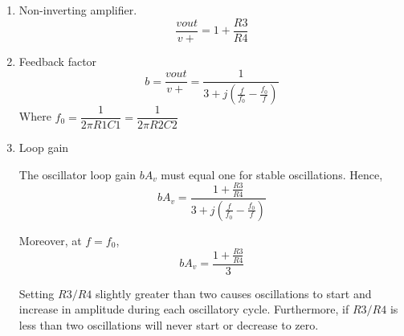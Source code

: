 \begin{enumerate}
\item  Non-inverting amplifier.
\begin{equation}
\dfrac{vout}{v+} = 1 + \dfrac{R3}{R4}
\end{equation}

\item Feedback factor
\begin{equation}
b = \dfrac{vout}{v+} =\dfrac{1}{3+j(\frac{f}{f_{0}}-\frac{f_{0}}{f})}
\end{equation}
Where $f_{0} = \dfrac{1}{2\pi R1 C1} =\dfrac{1}{2\pi R2 C2} $

\item Loop gain

The oscillator loop gain $b A_{v}$ must equal one for stable oscillations. Hence,
\begin{equation}
b A_{v} = \dfrac{1+\frac{R3}{R4}}{3+j(\frac{f}{f_{0}}-\frac{f_{0}}{f})}
\end{equation}

Moreover, at $f = f_{0}$,  
\begin{equation}
b A_{v} = \dfrac{1+\frac{R3}{R4}}{3}
\end{equation}

Setting $R3/R4$ slightly greater than two causes oscillations to start and increase in amplitude during each oscillatory cycle. Furthermore, if $R3/R4$ is less than two oscillations will never start or decrease to zero.
\end{enumerate}


